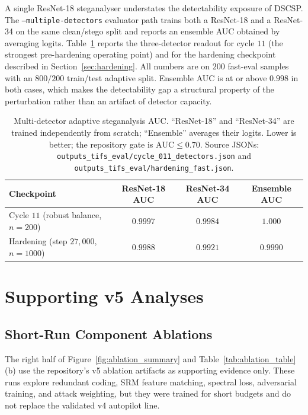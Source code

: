 \documentclass[journal]{IEEEtran}
\begin{document}
A single ResNet-18 steganalyser understates the detectability exposure of DSCSP.
The \texttt{--multiple-detectors} evaluator path trains both a ResNet-18 and a
ResNet-34 on the same clean/stego split and reports an ensemble AUC obtained by
averaging logits. Table~\ref{tab:multi_detector} reports the three-detector
readout for cycle $11$ (the strongest pre-hardening operating point) and for
the hardening checkpoint described in Section~\ref{sec:hardening}. All
numbers are on $200$ fast-eval samples with an $800/200$ train/test adaptive
split. Ensemble AUC is at or above $0.998$ in both cases, which makes the
detectability gap a structural property of the perturbation rather than an
artifact of detector capacity.

\begin{table}[t]
\centering
\caption{Multi-detector adaptive steganalysis AUC. ``ResNet-18'' and
``ResNet-34'' are trained independently from scratch; ``Ensemble'' averages
their logits. Lower is better; the repository gate is $\text{AUC}\leq 0.70$.
Source JSONs: \texttt{outputs\_tifs\_eval/cycle\_011\_detectors.json} and
\texttt{outputs\_tifs\_eval/hardening\_fast.json}.}
\label{tab:multi_detector}
\small
\begin{tabular}{l c c c}
\toprule
Checkpoint & ResNet-18 AUC & ResNet-34 AUC & Ensemble AUC \\
\midrule
Cycle $11$ (robust balance, $n=200$) & $0.9997$ & $0.9984$ & $1.000$ \\
Hardening (step $27{,}000$, $n=1000$) & $0.9988$ & $0.9921$ & $0.9990$ \\
\bottomrule
\end{tabular}
\end{table}

\section{Supporting v5 Analyses}
\subsection{Short-Run Component Ablations}
The right half of Figure~\ref{fig:ablation_summary} and Table~\ref{tab:ablation_table}(b) use the repository's v5 ablation artifacts as supporting evidence only. These runs explore redundant coding, SRM feature matching, spectral loss, adversarial training, and attack weighting, but they were trained for short budgets and do not replace the validated v4 autopilot line.
\end{document}
